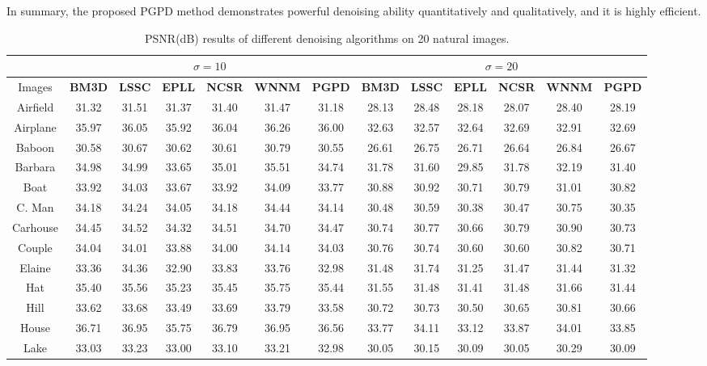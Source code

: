 In summary, the proposed PGPD method demonstrates powerful denoising ability quantitatively and qualitatively, and it is highly efficient.
\begin{table}[t!]
\begin{adjustwidth}{-0.2cm}{}
\caption{PSNR(dB) results of different denoising algorithms on 20 natural images.}
\label{tab2-2}
\begin{center}
\renewcommand\arraystretch{1.0}
\scriptsize
\begin{tabular}{|c||c|c|c|c|c|c||c|c|c|c|c|c|}
\hline
&\multicolumn{6}{c||}{ $\sigma = 10$}&\multicolumn{6}{c|}{ $\sigma = 20$}
\\
\hline
\hline
Images&\textbf{BM3D}&\textbf{LSSC}&\textbf{EPLL}&\textbf{NCSR}&\textbf{WNNM}&\textbf{PGPD}
&\textbf{BM3D}&\textbf{LSSC}&\textbf{EPLL}&\textbf{NCSR}&\textbf{WNNM}&\textbf{PGPD} 
\\
\hline
Airfield &31.32&31.51&31.37&31.40 &31.47 &31.18    &28.13&28.48 &28.18&28.07&28.40&28.19 
\\
\hline
Airplane &35.97 &36.05&35.92&36.04&36.26 &36.00  &32.63&32.57 &32.64&32.69&32.91&32.69 
\\
\hline
 Baboon &30.58&30.67&30.62&30.61&30.79&30.55     &26.61&26.75 &26.71&26.64&26.84&26.67
\\
\hline 
 Barbara &34.98&34.99&33.65 &35.01&35.51&34.74    &31.78&31.60 &29.85 &31.78 &32.19&31.40
\\
\hline
 Boat &33.92&34.03 &33.67&33.92&34.09&33.77     &30.88&30.92&30.71&30.79&31.01&30.82
\\
\hline
 C. Man &34.18 &34.24&34.05 &34.18&34.44&34.14      &30.48 &30.59 &30.38 &30.47&30.75&30.35 
\\
\hline
 Carhouse &34.45&34.52&34.32 &34.51&34.70 &34.47   &30.74&30.77&30.66&30.79&30.90&30.73
\\
\hline
 Couple &34.04&34.01&33.88&34.00&34.14&34.03    &30.76 &30.74&30.60&30.60&30.82&30.71 
\\
\hline
 Elaine &33.36 &34.36&32.90&33.83&33.76&32.98    &31.48 &31.74 &31.25&31.47&31.44&31.32
\\
\hline
 Hat &35.40 &35.56&35.23&35.45&35.75&35.44    &31.55 &31.48&31.41&31.48&31.66 &31.44
\\
\hline
 Hill &33.62 &33.68&33.49&33.69&33.79&33.58      &30.72&30.73 &30.50&30.65&30.81&30.66
\\
\hline
 House &36.71 &36.95&35.75&36.79&36.95&36.56     &33.77&34.11 &33.12&33.87&34.01&33.85
\\
\hline
 Lake &33.03 &33.23&33.00&33.10 &33.21&32.98      &30.05&30.15&30.09 &30.05&30.29&30.09

\end{tabular}
\end{center}
\end{adjustwidth}
\end{table}
